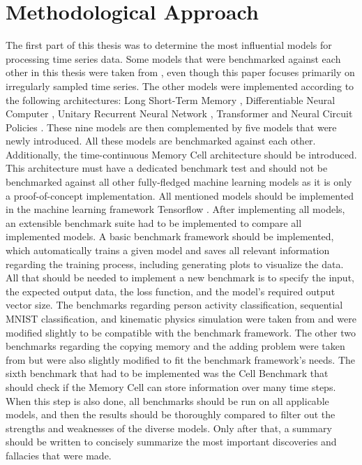 \documentclass[draft,final]{vutinfth} %
\begin{document}
    \section{Methodological Approach}
    The first part of this thesis was to determine the most influential models for processing time series data.
    Some models that were benchmarked against each other in this thesis were taken from \cite{ODELSTM}, even though this paper focuses primarily on irregularly sampled time series.
    The other models were implemented according to the following architectures: Long Short-Term Memory \cite{LSTM}, Differentiable Neural Computer \cite{DNC}, Unitary Recurrent Neural Network \cite{EfficientUnitaryRNNs}, Transformer \cite{Transformer} and Neural Circuit Policies \cite{NCP}.
    These nine models are then complemented by five models that were newly introduced.
    All these models are benchmarked against each other.
    Additionally, the time-continuous Memory Cell architecture should be introduced.
    This architecture must have a dedicated benchmark test and should not be benchmarked against all other fully-fledged machine learning models as it is only a proof-of-concept implementation.
    All mentioned models should be implemented in the machine learning framework Tensorflow \cite{Tensorflow}.
    After implementing all models, an extensible benchmark suite had to be implemented to compare all implemented models.
    A basic benchmark framework should be implemented, which automatically trains a given model and saves all relevant information regarding the training process, including generating plots to visualize the data.
    All that should be needed to implement a new benchmark is to specify the input, the expected output data, the loss function, and the model's required output vector size.
    The benchmarks regarding person activity classification, sequential MNIST classification, and kinematic physics simulation were taken from \cite{ODELSTM} and were modified slightly to be compatible with the benchmark framework.
    The other two benchmarks regarding the copying memory and the adding problem were taken from \cite{UnitaryRNNs} but were also slightly modified to fit the benchmark framework's needs.
    The sixth benchmark that had to be implemented was the Cell Benchmark that should check if the Memory Cell can store information over many time steps.
    When this step is also done, all benchmarks should be run on all applicable models, and then the results should be thoroughly compared to filter out the strengths and weaknesses of the diverse models.
    Only after that, a summary should be written to concisely summarize the most important discoveries and fallacies that were made.
\end{document}
